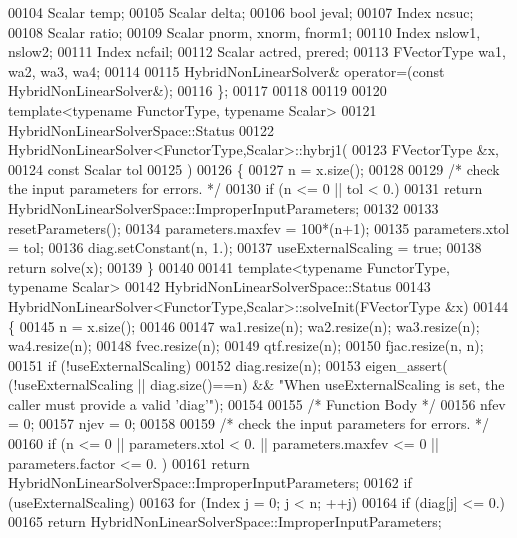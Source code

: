 \begin{DoxyCode}
00104     Scalar temp;
00105     Scalar delta;
00106     \textcolor{keywordtype}{bool} jeval;
00107     Index ncsuc;
00108     Scalar ratio;
00109     Scalar pnorm, xnorm, fnorm1;
00110     Index nslow1, nslow2;
00111     Index ncfail;
00112     Scalar actred, prered;
00113     FVectorType wa1, wa2, wa3, wa4;
00114 
00115     HybridNonLinearSolver& operator=(\textcolor{keyword}{const} HybridNonLinearSolver&);
00116 \};
00117 
00118 
00119 
00120 \textcolor{keyword}{template}<\textcolor{keyword}{typename} FunctorType, \textcolor{keyword}{typename} Scalar>
00121 HybridNonLinearSolverSpace::Status
00122 HybridNonLinearSolver<FunctorType,Scalar>::hybrj1(
00123         FVectorType  &x,
00124         \textcolor{keyword}{const} Scalar tol
00125         )
00126 \{
00127     n = x.size();
00128 
00129     \textcolor{comment}{/* check the input parameters for errors. */}
00130     \textcolor{keywordflow}{if} (n <= 0 || tol < 0.)
00131         \textcolor{keywordflow}{return} HybridNonLinearSolverSpace::ImproperInputParameters;
00132 
00133     resetParameters();
00134     parameters.maxfev = 100*(n+1);
00135     parameters.xtol = tol;
00136     diag.setConstant(n, 1.);
00137     useExternalScaling = \textcolor{keyword}{true};
00138     \textcolor{keywordflow}{return} solve(x);
00139 \}
00140 
00141 \textcolor{keyword}{template}<\textcolor{keyword}{typename} FunctorType, \textcolor{keyword}{typename} Scalar>
00142 HybridNonLinearSolverSpace::Status
00143 HybridNonLinearSolver<FunctorType,Scalar>::solveInit(FVectorType  &x)
00144 \{
00145     n = x.size();
00146 
00147     wa1.resize(n); wa2.resize(n); wa3.resize(n); wa4.resize(n);
00148     fvec.resize(n);
00149     qtf.resize(n);
00150     fjac.resize(n, n);
00151     \textcolor{keywordflow}{if} (!useExternalScaling)
00152         diag.resize(n);
00153     eigen\_assert( (!useExternalScaling || diag.size()==n) && \textcolor{stringliteral}{"When useExternalScaling is set, the caller
       must provide a valid 'diag'"});
00154 
00155     \textcolor{comment}{/* Function Body */}
00156     nfev = 0;
00157     njev = 0;
00158 
00159     \textcolor{comment}{/*     check the input parameters for errors. */}
00160     \textcolor{keywordflow}{if} (n <= 0 || parameters.xtol < 0. || parameters.maxfev <= 0 || parameters.factor <= 0. )
00161         \textcolor{keywordflow}{return} HybridNonLinearSolverSpace::ImproperInputParameters;
00162     \textcolor{keywordflow}{if} (useExternalScaling)
00163         \textcolor{keywordflow}{for} (Index j = 0; j < n; ++j)
00164             \textcolor{keywordflow}{if} (diag[j] <= 0.)
00165                 \textcolor{keywordflow}{return} HybridNonLinearSolverSpace::ImproperInputParameters;

\end{DoxyCode}
